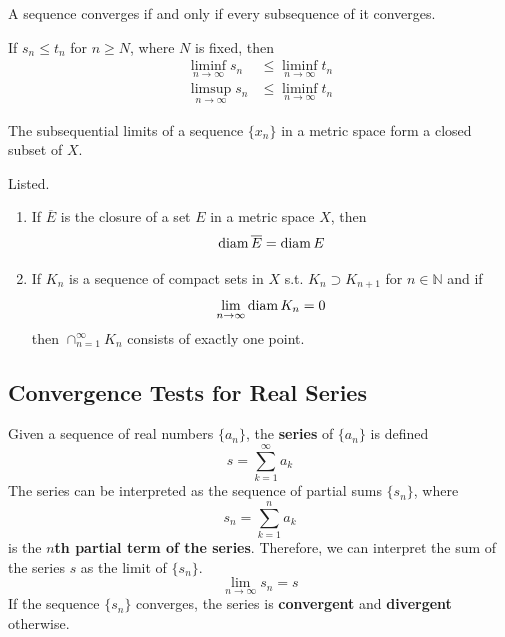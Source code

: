   \begin{corollary}
    A sequence converges if and only if every subsequence of it converges. 
  \end{corollary}

  \begin{theorem}
    If $s_n \leq t_n$ for $n \geq N$, where $N$ is fixed, then 
    \begin{align*}
      \liminf_{n \rightarrow \infty} s_n & \leq \liminf_{n \rightarrow \infty} t_n \\
      \limsup_{n \rightarrow \infty} s_n & \leq \liminf_{n \rightarrow \infty} t_n 
    \end{align*}
  \end{theorem}

  \begin{theorem}
    The subsequential limits of a sequence $\{x_n\}$ in a metric space form a closed subset of $X$. 
  \end{theorem}

  \begin{theorem}
    Listed. 
    \begin{enumerate}
      \item If $\overline{E}$ is the closure of a set $E$ in a metric space $X$, then 
      \[\operatorname{diam}{\overline{E}} = \operatorname{diam}{E}\]

      \item If $K_n$ is a sequence of compact sets in $X$ s.t. $K_n \supset K_{n+1}$ for $n \in \mathbb{N}$ and if 
      \[\lim_{n \rightarrow \infty} \operatorname{diam}{K_n} = 0\]
      then $\cap_{n=1}^\infty K_n$ consists of exactly one point. 
    \end{enumerate}
  \end{theorem}
  
\subsection{Convergence Tests for Real Series}

  \begin{definition}
    Given a sequence of real numbers $\{a_n\}$, the \textbf{series} of $\{a_n\}$ is defined
    \begin{equation}
      s = \sum_{k=1}^\infty a_k
    \end{equation}
    The series can be interpreted as the sequence of partial sums $\{s_n\}$, where
    \begin{equation}
      s_n = \sum_{k=1}^n a_k
    \end{equation}
    is the \textbf{$n$th partial term of the series}. Therefore, we can interpret the sum of the series $s$ as the limit of $\{s_n\}$. 
    \begin{equation}
      \lim_{n \rightarrow \infty} s_n = s
    \end{equation}
    If the sequence $\{s_n\}$ converges, the series is \textbf{convergent} and \textbf{divergent} otherwise. 
  \end{definition}

